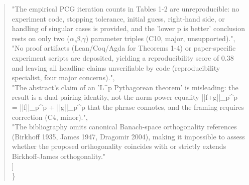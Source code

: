 \documentclass[11pt]{article}
\begin{document}
\begin{quote}
    "The empirical PCG iteration counts in Tables 1-2 are unreproducible: no experiment code, stopping tolerance, initial guess, right-hand side, or handling of singular cases is provided, and the 'lower p is better' conclusion rests on only two (\ensuremath{\alpha},\ensuremath{\beta},\ensuremath{\gamma}) parameter triples (C10, major, unsupported).",\\
    "No proof artifacts (Lean/Coq/Agda for Theorems 1-4) or paper-specific experiment scripts are deposited, yielding a reproducibility score of 0.38 and leaving all headline claims unverifiable by code (reproducibility specialist, four major concerns).",\\
    "The abstract's claim of an 'L\^{}p Pythagorean theorem' is misleading: the result is a dual-pairing identity, not the norm-power equality ||f+g||\_p\^{}p = ||f||\_p\^{}p + ||g||\_p\^{}p that the phrase connotes, and the framing requires correction (C4, minor).",\\
    "The bibliography omits canonical Banach-space orthogonality references (Birkhoff 1935, James 1947, Dragomir 2004), making it impossible to assess whether the proposed orthogonality coincides with or strictly extends Birkhoff-James orthogonality."\\
  ]\\
\}\\
\end{quote}
\end{document}
